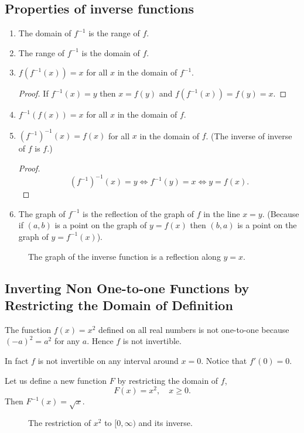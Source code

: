 \documentclass[../calc1-main.tex]{subfiles}
\begin{document}
\subsection*{Properties of inverse functions}
\begin{enumerate}
  \item The domain of $f^{-1}$ is the range of $f$.
  \item The range of $f^{-1}$ is the domain of $f$.
  \item $f(f^{-1}(x)) = x$ for all $x$ in the domain of $f^{-1}$.
  \begin{proof}
    If $f^{-1}(x) = y$ then $x = f(y)$ and $f(f^{-1}(x)) = f(y) = x$.
  \end{proof}
  \item $f^{-1}(f(x)) = x$ for all $x$ in the domain of $f$.
  \item $(f^{-1})^{-1}(x) = f(x)$ for all $x$ in the domain of $f$. (The inverse of inverse of $f$ is $f$.)
  \begin{proof}
    \[
      (f^{-1})^{-1}(x) = y \iff f^{-1}(y) = x \iff y = f(x).
    \]
  \end{proof}
  \item The graph of $f^{-1}$ is the reflection of the graph of $f$ in the line $x=y$. (Because if $(a, b)$ is a point on the graph of $y=f(x)$ then $(b, a)$ is a point on the graph of $y = f^{-1}(x)$).
\end{enumerate}
\begin{figure}[H]
  \centering
  
  \caption{The graph of the inverse function is a reflection along $y=x$.}
\end{figure}

\subsection*{Inverting Non One-to-one Functions by Restricting the Domain of Definition}
\begin{minipage}{0.5\textwidth}
  The function $f(x) = x^2$ defined on all real numbers is not one-to-one because $(-a)^2 = a^2$ for any $a$. Hence $f$ is not invertible.

  In fact $f$ is not invertible on any interval around $x=0$. Notice that $f'(0)=0$.

  Let us define a new function $F$ by restricting the domain of $f$,
  \[
    F(x) = x^2, \quad x \geq 0.
  \]
  Then $F^{-1}(x) = \sqrt{x}$.


\end{minipage}%
\begin{minipage}{0.5\textwidth}
  \begin{figure}[H]
    \centering
    
    \caption{The restriction of $x^2$ to $[0, \infty)$ and its inverse.}
  \end{figure}
\end{minipage}
\end{document}
